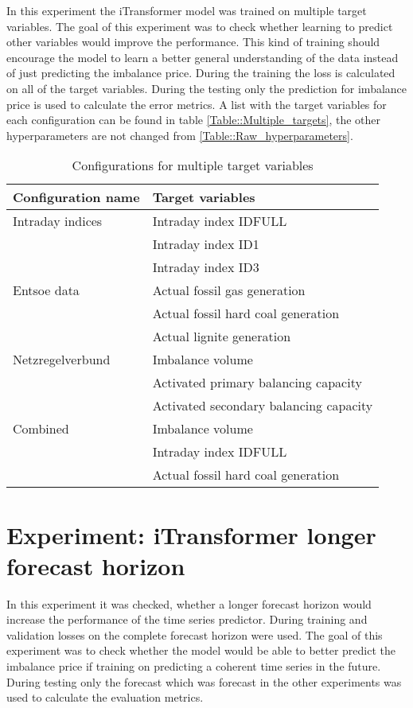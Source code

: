 \documentclass[class=scrbook, crop=false]{standalone}
\begin{document}
  In this experiment the iTransformer model was trained on multiple target variables.
  The goal of this experiment was to check whether learning to predict other variables would improve the performance.
  This kind of training should encourage the model to learn a better general understanding of the data instead of just predicting the imbalance price.
  During the training the loss is calculated on all of the target variables. 
  During the testing only the prediction for imbalance price is used to calculate the error metrics.
  A list with the target variables for each configuration can be found in table \ref{Table::Multiple_targets}, the other hyperparameters are not changed from \ref{Table::Raw_hyperparameters}.
  
  \begin{table}[]
\centering
\begin{tabular}{l|l}
 Configuration name & Target variables  \\\hline
 Intraday indices&   Intraday index IDFULL\\
 		& Intraday index ID1 \\
 		& Intraday index ID3 \\ \hline
 Entsoe data & Actual fossil gas generation  \\
 		& Actual fossil hard coal generation \\
 		& Actual lignite generation \\ \hline
 Netzregelverbund & Imbalance volume  \\
 		& Activated primary balancing capacity \\
 		& Activated secondary balancing capacity \\ \hline
 Combined & Imbalance volume   \\
 		& Intraday index IDFULL \\
 		& Actual fossil hard coal generation \\ 
\end{tabular}
\caption{Configurations for multiple target variables}
\label{Table::Multiple_Targets}
\end{table}

\section{Experiment: iTransformer longer forecast horizon}

In this experiment it was checked, whether a longer forecast horizon would increase the performance of the time series predictor.
During training and validation losses on the complete forecast horizon were used. 
The goal of this experiment was to check whether the model would be able to better predict the imbalance price if training on predicting a coherent time series in the future.
During testing only  the forecast which was forecast in the other experiments was used to calculate the evaluation metrics.
\end{document}
